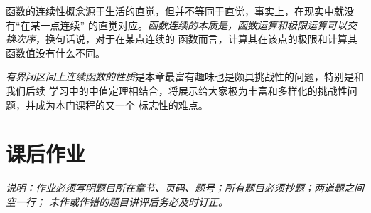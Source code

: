 函数的连续性概念源于生活的直觉，但并不等同于直觉，事实上，在现实中就没有“在某一点连续”
的直觉对应。{\it 函数连续的本质是，函数运算和极限运算可以交换次序}，换句话说，对于在某点连续的
函数而言，计算其在该点的极限和计算其函数值没有什么不同。

{\it 有界闭区间上连续函数的性质}是本章最富有趣味也是颇具挑战性的问题，特别是和我们后续
学习中的中值定理相结合，将展示给大家极为丰富和多样化的挑战性问题，并成为本门课程的又一个
标志性的难点。

\newpage

\section*{课后作业}
{\b\it 说明：作业必须写明题目所在章节、页码、题号；所有题目必须抄题；两道题之间空一行；
未作或作错的题目讲评后务必及时订正。}

